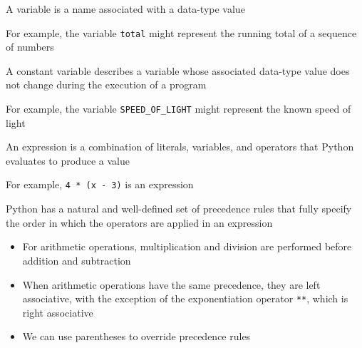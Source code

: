 \documentclass[8pt,a4paper,compress]{beamer}
\begin{document}
\begin{frame}[fragile]
\pause

A variable is a name associated with a data-type value

\pause\bigskip

For example, the variable \lstinline{total} might represent the running total of a sequence of numbers

\pause\bigskip

A constant variable describes a variable whose associated data-type value does not change during the execution of a program

\pause\bigskip

For example, the variable \lstinline{SPEED_OF_LIGHT} might represent the known speed of light

\pause\bigskip

An expression is a combination of literals, variables, and operators that Python evaluates to produce a value

\pause\bigskip

For example, \lstinline{4 * (x - 3)} is an expression

\pause\bigskip

Python has a natural and well-defined set of precedence rules that fully specify the order in which the operators are applied in an expression
\begin{itemize}
\pause
\item For arithmetic operations, multiplication and division are performed before addition and subtraction

\pause
\item When arithmetic operations have the same precedence, they are left associative, with the exception of the exponentiation operator \lstinline{**}, which is right associative

\pause
\item We can use parentheses to override precedence rules
\end{itemize} 
\end{frame}
\end{document}
